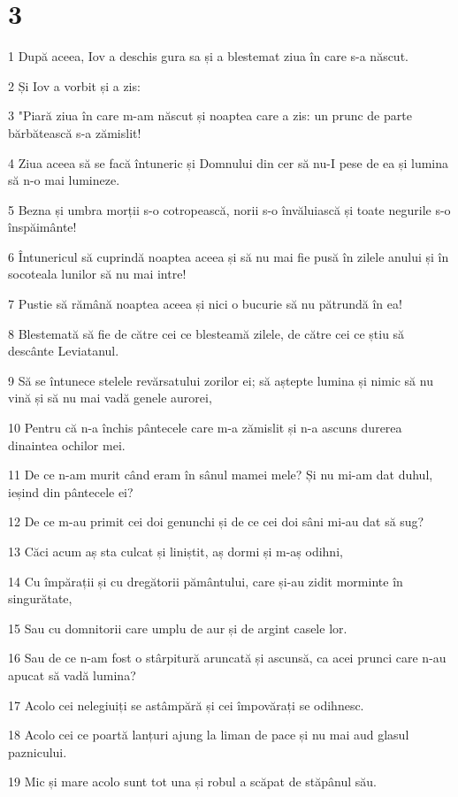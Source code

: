 \chapter{3}

\par 1 După aceea, Iov a deschis gura sa și a blestemat ziua în care s-a născut.
\par 2 Și Iov a vorbit și a zis:
\par 3 "Piară ziua în care m-am născut și noaptea care a zis: un prunc de parte bărbătească s-a zămislit!
\par 4 Ziua aceea să se facă întuneric și Domnului din cer să nu-I pese de ea și lumina să n-o mai lumineze.
\par 5 Bezna și umbra morții s-o cotropească, norii s-o învăluiască și toate negurile s-o înspăimânte!
\par 6 Întunericul să cuprindă noaptea aceea și să nu mai fie pusă în zilele anului și în socoteala lunilor să nu mai intre!
\par 7 Pustie să rămână noaptea aceea și nici o bucurie să nu pătrundă în ea!
\par 8 Blestemată să fie de către cei ce blesteamă zilele, de către cei ce știu să descânte Leviatanul.
\par 9 Să se întunece stelele revărsatului zorilor ei; să aștepte lumina și nimic să nu vină și să nu mai vadă genele aurorei,
\par 10 Pentru că n-a închis pântecele care m-a zămislit și n-a ascuns durerea dinaintea ochilor mei.
\par 11 De ce n-am murit când eram în sânul mamei mele? Și nu mi-am dat duhul, ieșind din pântecele ei?
\par 12 De ce m-au primit cei doi genunchi și de ce cei doi sâni mi-au dat să sug?
\par 13 Căci acum aș sta culcat și liniștit, aș dormi și m-aș odihni,
\par 14 Cu împărații și cu dregătorii pământului, care și-au zidit morminte în singurătate,
\par 15 Sau cu domnitorii care umplu de aur și de argint casele lor.
\par 16 Sau de ce n-am fost o stârpitură aruncată și ascunsă, ca acei prunci care n-au apucat să vadă lumina?
\par 17 Acolo cei nelegiuiți se astâmpără și cei împovărați se odihnesc.
\par 18 Acolo cei ce poartă lanțuri ajung la liman de pace și nu mai aud glasul paznicului.
\par 19 Mic și mare acolo sunt tot una și robul a scăpat de stăpânul său.

